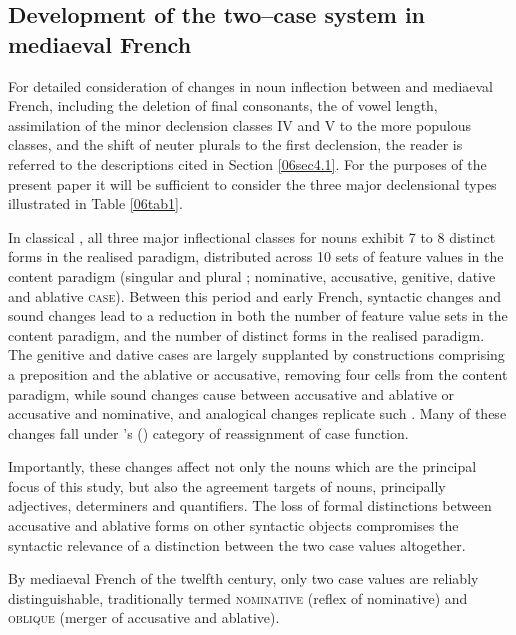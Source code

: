 \documentclass[output=paper,colorlinks,citecolor=brown]{langscibook}
\begin{document}
\subsection{Development of the two--case system in mediaeval French}

For detailed consideration of changes in noun inflection between  and mediaeval French, including the deletion of final consonants, the  of vowel length, assimilation of the minor declension classes IV and V to the more populous classes, and the shift of neuter plurals to the first declension, the reader is referred to the descriptions cited in Section \ref{06sec4.1}. For the purposes of the present paper it will be sufficient to consider the three major declensional types illustrated in Table \ref{06tab1}.

In classical , all three major inflectional classes for nouns exhibit 7 to 8 distinct forms in the realised paradigm, distributed across 10 sets of feature values in the content paradigm (singular and plural \textsc{}; nominative, accusative, genitive, dative and ablative \textsc{case}). Between this period and early French, syntactic changes and sound changes lead to a reduction in both the number of feature value sets in the content paradigm, and the number of distinct forms in the realised paradigm. The genitive and dative cases are largely supplanted by constructions comprising a preposition and the ablative or accusative, removing four cells from the content paradigm, while sound changes cause  between accusative and ablative or accusative and nominative, and analogical changes replicate such . Many of these changes fall under \citeauthor{baerman2008}'s (\citeyear{baerman2008}) category of reassignment of case function.

Importantly, these changes affect not only the nouns which are the principal focus of this study, but also the agreement targets of nouns, principally adjectives, determiners and quantifiers. The loss of formal distinctions between accusative and ablative forms on other syntactic objects compromises the syntactic relevance of a distinction between the two case values altogether.

By mediaeval French of the twelfth century, only two case values are reliably distinguishable, traditionally termed \textsc{nominative} (reflex of  nominative) and \textsc{oblique} (merger of  accusative and ablative).
\end{document}
